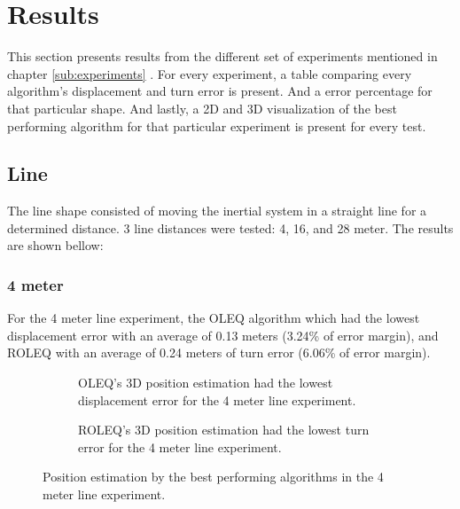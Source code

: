 \section{Results}

This section presents results from the different set of experiments mentioned in chapter \ref{sub:experiments} . For every experiment, a table comparing every algorithm's displacement and turn error is present. And a error percentage for that particular shape. And lastly, a 2D and 3D visualization of the best performing algorithm for that particular experiment is present for every test.

\subsection{Line}

The line shape consisted of moving the inertial system in a straight line for a determined distance. 3 line distances were tested: 4, 16, and 28 meter. The results are shown bellow:

\subsubsection{4 meter}

For the 4 meter line experiment, the OLEQ algorithm which had the lowest displacement error with an average of 0.13 meters (3.24\% of error margin), and ROLEQ with an average of 0.24 meters of turn error (6.06\% of error margin).

\begin{figure}[!h]
    \centering
    
\end{figure}

\begin{figure}[!h]
    \centering
    \begin{subfigure}{0.49\textwidth}
        \centering
        \resizebox{1\linewidth}{!}{}
        \caption{ OLEQ's 3D position estimation had the lowest displacement error for the 4 meter line experiment. }
        \label{fig:line4_2D}
    \end{subfigure}
    \begin{subfigure}{0.49\textwidth}
        \centering
        \resizebox{1\linewidth}{!}{}
        \caption{ ROLEQ's 3D position estimation had the lowest turn error for the 4 meter line experiment. }
        \label{fig:line4_3D}
    \end{subfigure}
    \caption{Position estimation by the best performing algorithms in the 4 meter line experiment.}
    \label{fig:line4}
\end{figure}


